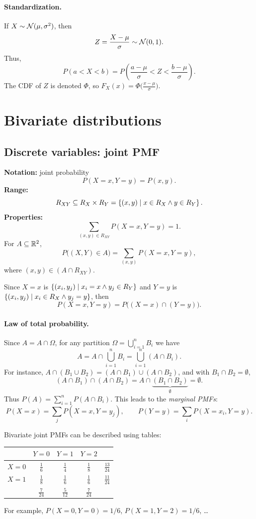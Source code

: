\paragraph{Standardization.}
If $X \sim \mathcal{N}(\mu,\sigma^2)$, then
\[
Z = \frac{X - \mu}{\sigma} \sim \mathcal{N}(0,1).
\]
Thus,
\[
P(a < X < b) = P\left(\frac{a-\mu}{\sigma} < Z < \frac{b-\mu}{\sigma}\right).
\]
The CDF of $Z$ is denoted $\Phi$, so $F_X(x) = \Phi\big(\frac{x-\mu}{\sigma}\big)$.

\section{Bivariate distributions}

\subsection{Discrete variables: joint PMF}
\textbf{Notation:} joint probability
\[
P(X = x, Y = y) = P(x,y).
\]
\textbf{Range:}
\[
R_{XY} \subseteq R_X \times R_Y = \left\{(x,y) \mid x \in R_X \wedge y \in R_Y\right\}.
\]
\textbf{Properties:}
\[
\sum_{(x,y) \in R_{XY}} P(X = x, Y = y) = 1.
\]
For $A \subseteq \mathbb{R}^2$,
\[
P\big((X,Y) \in A\big) = \sum_{(x,y)} P(X = x, Y = y),
\]
where $(x,y) \in (A \cap R_{XY})$.

Since $X = x$ is $\left\{(x_i, y_j) \mid x_i = x \wedge y_j \in R_Y\right\}$ and $Y = y$ is $\left\{(x_i, y_j) \mid x_i \in R_X \wedge y_j = y\right\}$, then
\[
P(X = x, Y = y) = P\big((X = x) \cap (Y = y)\big).
\]

\paragraph{Law of total probability.}
Since $A = A \cap \Omega$, for any partition $\Omega = \bigcup_{i=1}^{n} B_i$ we have
\[
A = A \cap \bigcup_{i=1}^{n} B_i = \bigcup_{i=1}^{n}(A \cap B_i).
\]
For instance, $A \cap (B_1 \cup B_2) = (A \cap B_1) \cup (A \cap B_2)$, and with $B_1 \cap B_2 = \emptyset$,
\[
(A \cap B_1) \cap (A \cap B_2) = A \cap \underbrace{(B_1 \cap B_2)}_{\emptyset} = \emptyset.
\]
Thus $P(A) = \sum_{i=1}^{n} P(A \cap B_i)$. This leads to the \emph{marginal PMFs}:
\[
P(X = x) = \sum_{j} P(X = x, Y = y_j), \qquad P(Y = y) = \sum_{i} P(X = x_i, Y = y).
\]

Bivariate joint PMFs can be described using tables:
\begin{center}
\begin{tabular}{c|ccc|c}
 & $Y=0$ & $Y=1$ & $Y=2$ & \\ \hline
$X=0$ & $\frac16$ & $\frac14$ & $\frac18$ & $\frac{13}{24}$\\[2pt]
$X=1$ & $\frac18$ & $\frac16$ & $\frac16$ & $\frac{11}{24}$\\ \hline
 & $\frac{7}{24}$ & $\frac{5}{12}$ & $\frac{7}{24}$ &
\end{tabular}
\end{center}
For example, $P(X=0, Y=0) = 1/6$, $P(X=1, Y=2) = 1/6$, \dots

